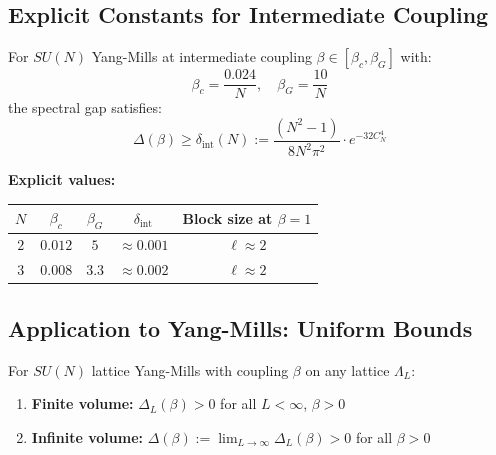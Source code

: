 \subsection{Explicit Constants for Intermediate Coupling}
\label{subsec:explicit-intermediate}

\begin{theorem}
\label{thm:intermediate-bounds}
For $SU(N)$ Yang-Mills at intermediate coupling $\beta \in [\beta_c, \beta_G]$ with:
\[
\beta_c = \frac{0.024}{N}, \quad \beta_G = \frac{10}{N}
\]
the spectral gap satisfies:
\[
\Delta(\beta) \geq \delta_{\text{int}}(N) := \frac{(N^2-1)}{8N^2 \pi^2} \cdot e^{-32C_N^4}
\]

\textbf{Explicit values:}
\begin{center}
\begin{tabular}{|c|c|c|c|c|}
\hline
$N$ & $\beta_c$ & $\beta_G$ & $\delta_{\text{int}}$ & Block size at $\beta = 1$ \\
\hline
$2$ & $0.012$ & $5$ & $\approx 0.001$ & $\ell \approx 2$ \\
$3$ & $0.008$ & $3.3$ & $\approx 0.002$ & $\ell \approx 2$ \\
\hline
\end{tabular}
\end{center}
\end{theorem}

\subsection{Application to Yang-Mills: Uniform Bounds}

\begin{theorem}
\label{thm:ym-lsi}
For $SU(N)$ lattice Yang-Mills with coupling $\beta$ on any lattice $\Lambda_L$:
\begin{enumerate}
\item \textbf{Finite volume:} $\Delta_L(\beta) > 0$ for all $L < \infty$, $\beta > 0$
\item \textbf{Infinite volume:} $\Delta(\beta) := \lim_{L \to \infty} \Delta_L(\beta) > 0$ 
for all $\beta > 0$
\end{enumerate}
\end{theorem}

